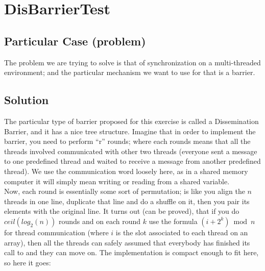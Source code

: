 \section{\textbf{DisBarrierTest}}

\subsection{Particular Case (problem)}
The problem we are trying to solve is that of synchronization on a
multi-threaded environment; and the particular mechanism we want to
use for that is a barrier. 

\subsection{Solution}
The particular type of barrier proposed for this exercise is called a
Dissemination Barrier, and it has a nice tree structure. Imagine that
in order to implement the barrier, you need to perform ``r'' rounds;
where each rounds means that all the threads involved communicated
with other two threads (everyone sent a message to one predefined
thread and waited to receive a message from another predefined
thread). We use the communication word loosely here, as in a shared
memory computer it will simply mean writing or reading from a shared
variable. \\ 

Now, each round is essentially some sort of permutation; is like you
align the $n$ threads in one line, duplicate that line and do a
shuffle on it, then you pair its elements with the original line. It
turns out (can be proved), that if you do $ceil(log_2(n))$ rounds and
on each round $k$ use the formula $(i+2^k) \bmod n$ for thread
communication (where $i$ is the slot associated to each thread on an
array), then all the threads can safely assumed that everybody has
finished its call to  and they can move on. The
implementation is compact enough to fit here, so here it goes: \\ 

